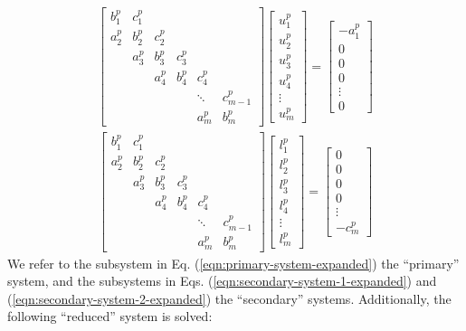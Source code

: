 \documentclass{elsarticle}
\begin{document}
\begin{align}
& \begin{bmatrix}
b_1^p & c_1^p \\
a_2^p & b_2^p & c_2^p \\
      & a_3^p & b_3^p & c_3^p \\
      &       & a_4^p & b_4^p & c_4^p \\
      &       &       &       &  \ddots & c_{m-1}^p\\
      &       &       &       &     a_{m}^p  & b_{m}^p
\end{bmatrix}
\begin{bmatrix}
u_1^p \\
u_2^p \\
u_3^p \\
u_4^p \\
\vdots \\
u_m^p
\end{bmatrix}
=
\begin{bmatrix}
-a_1^p \\
0 \\
0 \\
0 \\
\vdots \\
0
\end{bmatrix} & \label{eqn:secondary-system-1-expanded} 
\end{align}
%
\begin{align}
& \begin{bmatrix}
b_1^p & c_1^p \\
a_2^p & b_2^p & c_2^p \\
      & a_3^p & b_3^p & c_3^p \\
      &       & a_4^p & b_4^p & c_4^p \\
      &       &       &       &  \ddots & c_{m-1}^p\\
      &       &       &       &     a_{m}^p  & b_{m}^p
\end{bmatrix}
\begin{bmatrix}
l_1^p \\
l_2^p \\
l_3^p \\
l_4^p \\
\vdots \\
l_m^p
\end{bmatrix}
=
\begin{bmatrix}
0 \\
0 \\
0 \\
0 \\
\vdots \\
-c_m^p
\end{bmatrix} & \label{eqn:secondary-system-2-expanded}
\end{align}
%
We refer to the subsystem in Eq. (\ref{eqn:primary-system-expanded})
the ``primary'' system, and the subsystems in
Eqs. (\ref{eqn:secondary-system-1-expanded}) and
(\ref{eqn:secondary-system-2-expanded})
the ``secondary'' systems.
Additionally, the following ``reduced'' system is solved:
\end{document}

